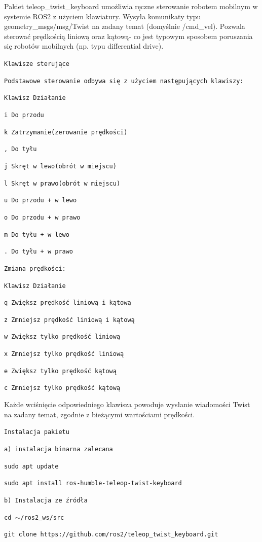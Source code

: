 \documentclass[12pt]{article}
\begin{document}
Pakiet teleop\_twist\_keyboard umożliwia ręczne sterowanie robotem mobilnym w systemie ROS2 z użyciem klawiatury. Wysyła komunikaty typu geometry\_msgs/msg/Twist na zadany temat (domyślnie /cmd\_vel). Pozwala sterować prędkością liniową oraz kątową- co jest typowym sposobem poruszania się robotów mobilnych (np. typu differential drive).

\texttt{Klawisze sterujące}

\texttt{Podstawowe sterowanie odbywa się z użyciem następujących klawiszy:}

\texttt{Klawisz  Działanie}

\texttt{i  Do przodu}

\texttt{k  Zatrzymanie(zerowanie prędkości)}

\texttt{,  Do tyłu}

\texttt{j  Skręt w lewo(obrót w miejscu)}

\texttt{l  Skręt w prawo(obrót w miejscu)}

\texttt{u Do przodu + w lewo}

\texttt{o  Do przodu + w prawo}

\texttt{m  Do tyłu + w lewo}

\texttt{.  Do tyłu + w prawo}

\texttt{Zmiana prędkości:}

\texttt{Klawisz  Działanie}

\texttt{q  Zwiększ prędkość liniową i kątową}

\texttt{z  Zmniejsz prędkość liniową i kątową}

\texttt{w  Zwiększ tylko prędkość liniową}

\texttt{x  Zmniejsz tylko prędkość liniową}

\texttt{e  Zwiększ tylko prędkość kątową}

\texttt{c  Zmniejsz tylko prędkość kątową}

Każde wciśnięcie odpowiedniego klawisza powoduje wysłanie wiadomości Twist na zadany temat, zgodnie z bieżącymi wartościami prędkości.

\texttt{Instalacja pakietu}

\texttt{a) instalacja binarna zalecana}

\texttt{sudo apt update}

\texttt{sudo apt install ros-humble-teleop-twist-keyboard}

\texttt{b) Instalacja ze źródła}

\texttt{cd $\sim$/ros2\_ws/src}

\texttt{git clone https://github.com/ros2/teleop\_twist\_keyboard.git}
\end{document}
